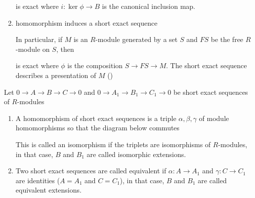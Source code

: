 \begin{remark}
\begin{enumerate}
		is exact where $i: \ker \phi \to B$ is the canonical inclusion map.
		
		\item homomorphism induces a short exact sequence
		
		In particular, if $M$ is an $R$-module generated by a set $S$ and $FS$ be the free $R$-module on $S$, then
		\begin{center}
		\end{center}
		
		is exact where $\phi$ is the composition $S \to FS \to M$. The short exact sequence describes a presentation of $M$ ()
	\end{enumerate}
\end{remark}

\begin{definition}
	Let $0 \to A \to B \to C \to 0$ and $0 \to A_1 \to B_1 \to C_1 \to 0$ be short exact sequences of $R$-modules
	\begin{enumerate}
		\item A homomorphism of short exact sequences is a triple $\alpha, \beta, \gamma$ of module homomorphisms so that the diagram below commutes
		\begin{center}
		\end{center}
		
		This is called an isomorphism if the triplets are isomorphisms of $R$-modules, in that case, $B$ and $B_1$ are called isomorphic extensions.
		
		\item Two short exact sequences are called equivalent if $\alpha: A \to A_1$ and $\gamma: C \to C_1$ are identities ($A = A_1$ and $C = C_1$), in that case, $B$ and $B_1$ are called equivalent extensions.
	\end{enumerate}
\end{definition}

